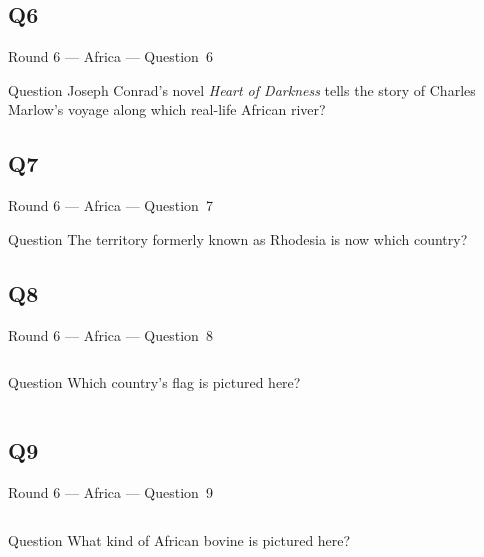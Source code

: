 \documentclass[11pt]{beamer}
\begin{document}
\subsection*{Q6}
\begin{frame}[t]{Round 6 --- Africa --- \mbox{Question 6}}
\vspace{-0.5em}
\begin{block}{Question}
Joseph Conrad's novel \emph{Heart of Darkness} tells the story of Charles Marlow's voyage along which real-life African river?
\end{block}
\end{frame}
\subsection*{Q7}
\begin{frame}[t]{Round 6 --- Africa --- \mbox{Question 7}}
\vspace{-0.5em}
\begin{block}{Question}
The territory formerly known as Rhodesia is now which country?
\end{block}
\end{frame}
\subsection*{Q8}
\begin{frame}[t]{Round 6 --- Africa --- \mbox{Question 8}}
\vspace{-0.5em}
\begin{columns}[T,totalwidth=\linewidth]
\begin{column}{0.32\linewidth}
\begin{block}{Question}
Which country's flag is pictured here?
\end{block}
\end{column}
\begin{column}{0.65\linewidth}
\begin{center}
\texttt{[image: \{Images/ghana]}.png}
\end{center}
\end{column}
\end{columns}
\end{frame}
\subsection*{Q9}
\begin{frame}[t]{Round 6 --- Africa --- \mbox{Question 9}}
\vspace{-0.5em}
\begin{columns}[T,totalwidth=\linewidth]
\begin{column}{0.32\linewidth}
\begin{block}{Question}
What kind of African bovine is pictured here?
\end{block}
\end{column}
\begin{column}{0.65\linewidth}
\begin{center}
\texttt{[image: \{Images/gnu]}.jpg}
\end{center}
\end{column}
\end{columns}
\end{frame}
\end{document}
